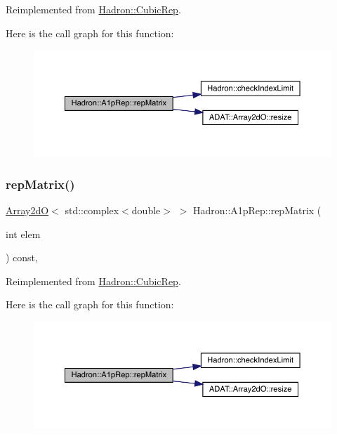 Reimplemented from \mbox{\hyperlink{structHadron_1_1CubicRep_ac5d7e9e6f4ab1158b5fce3e4ad9e8005}{Hadron\+::\+Cubic\+Rep}}.

Here is the call graph for this function\+:
\nopagebreak
\begin{figure}[H]
\begin{center}
\leavevmode
\includegraphics[width=350pt]{da/dc7/structHadron_1_1A1pRep_a23b801cc71ff71d666e68a3c065d3fae_cgraph}
\end{center}
\end{figure}
\mbox{\label{structHadron_1_1A1pRep_a23b801cc71ff71d666e68a3c065d3fae}} 
\subsubsection{\texorpdfstring{repMatrix()}{repMatrix()}\hspace{0.1cm}{\footnotesize\ttfamily [3/3]}}
{\footnotesize\ttfamily \mbox{\hyperlink{classADAT_1_1Array2dO}{Array2dO}}$<$ std\+::complex$<$double$>$ $>$ Hadron\+::\+A1p\+Rep\+::rep\+Matrix (\begin{DoxyParamCaption}\item[{int}]{elem }\end{DoxyParamCaption}) const\hspace{0.3cm}{\ttfamily [inline]}, {\ttfamily [virtual]}}



Reimplemented from \mbox{\hyperlink{structHadron_1_1CubicRep_ac5d7e9e6f4ab1158b5fce3e4ad9e8005}{Hadron\+::\+Cubic\+Rep}}.

Here is the call graph for this function\+:
\nopagebreak
\begin{figure}[H]
\begin{center}
\leavevmode
\includegraphics[width=350pt]{da/dc7/structHadron_1_1A1pRep_a23b801cc71ff71d666e68a3c065d3fae_cgraph}
\end{center}
\end{figure}


